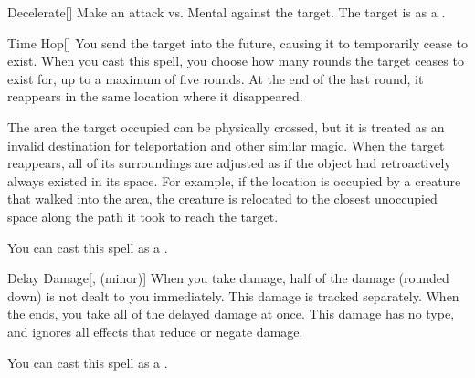 \lowercase{\hypertarget{spell:Decelerate}{}}\label{spell:Decelerate}
\begin{freeability}[\nth{2}]{\hypertarget{spell:Decelerate}{Decelerate}}[]
Make an attack vs. Mental against the target.
\hit The target is  as a .
\end{freeability}
\vspace{0.25em}



\lowercase{\hypertarget{spell:Time Hop}{}}\label{spell:Time Hop}
\begin{freeability}[\nth{2}]{\hypertarget{spell:Time Hop}{Time Hop}}[]
You send the target into the future, causing it to temporarily cease to exist.
When you cast this spell, you choose how many rounds the target ceases to exist for, up to a maximum of five rounds.
At the end of the last round, it reappears in the same location where it disappeared.

The area the target occupied can be physically crossed, but it is treated as an invalid destination for teleportation and other similar magic.
When the target reappears, all of its surroundings are adjusted as if the object had retroactively always existed in its space.
For example, if the location is occupied by a creature that walked into the area, the creature is relocated to the closest unoccupied space along the path it took to reach the target.

You can cast this spell as a .
\end{freeability}
\vspace{0.25em}



\lowercase{\hypertarget{spell:Delay Damage}{}}\label{spell:Delay Damage}
\begin{freeability}[\nth{3}]{\hypertarget{spell:Delay Damage}{Delay Damage}}[,  (minor)]
When you take damage, half of the damage (rounded down) is not dealt to you immediately.
This damage is tracked separately.
When the ends, you take all of the delayed damage at once.
This damage has no type, and ignores all effects that reduce or negate damage.

You can cast this spell as a .
\end{freeability}
\vspace{0.25em}



